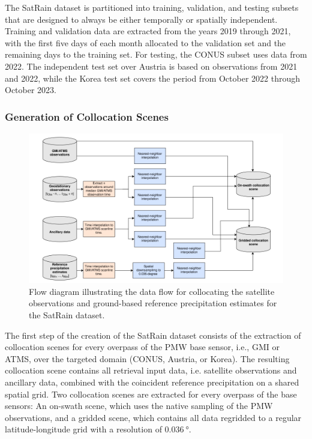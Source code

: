 \documentclass[11pt]{article}
\begin{document}
The SatRain dataset is partitioned into training, validation, and testing
subsets that are designed to always be either temporally or spatially
independent. Training and validation data are extracted from the years 2019
through 2021, with the first five days of each month allocated to the validation
set and the remaining days to the training set. For testing, the CONUS subset
uses data from 2022. The independent test set over Austria is based on
observations from 2021 and 2022, while the Korea test set covers the period from
October 2022 through October 2023.

\subsubsection{Generation of Collocation Scenes}

\begin{figure}[htbp]
	\centering
	\includegraphics[width=1.0\textwidth]{figures/fig07}
	\caption{
		Flow diagram illustrating the data flow for collocating the satellite
		observations and ground-based reference precipitation estimates for the SatRain
		dataset.
	}
	\label{fig:data_flow}
\end{figure}

The first step of the creation of the SatRain dataset consists of the extraction
of collocation scenes for every overpass of the PMW base sensor, i.e., GMI or
ATMS, over the targeted domain (CONUS, Austria, or Korea). The resulting
collocation scene contains all retrieval input data, i.e. satellite observations
and ancillary data, combined with the coincident reference precipitation on a
shared spatial grid. Two collocation scenes are extracted for every overpass of
the base sensors: An on-swath scene, which uses the native sampling of the PMW
observations, and a gridded scene, which contains all data regridded to a
regular latitude-longitude grid with a resolution of $\SI{0.036}{\degree}$.
\end{document}
